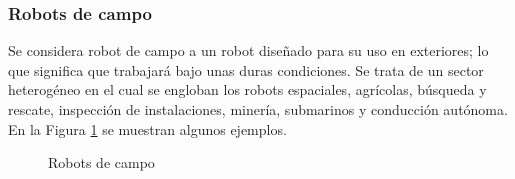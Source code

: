 \subsubsection{Robots de campo}
Se considera robot de campo a un robot diseñado para su uso en exteriores; lo que significa que trabajará bajo unas duras condiciones. 
Se trata de un sector heterogéneo en el cual se engloban los 
robots espaciales, agrícolas, búsqueda y rescate, inspección de instalaciones, minería, submarinos y conducción autónoma. En la Figura \ref{fig:campo} 
se muestran algunos ejemplos.
\begin{figure} [ht!]
  \centering    
  \hspace{3cm}
  \hspace{3cm}
  \hspace{3cm}
  \caption{Robots de campo}
  \label{fig:campo}
\end{figure}
\newpage
